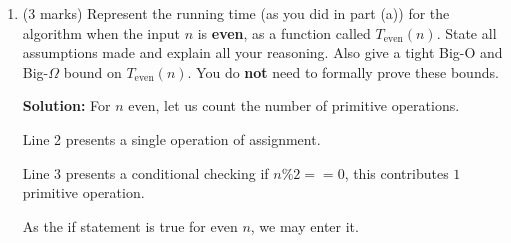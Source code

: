\documentclass[a4,13pt]{extarticle}
\DeclarePairedDelimiter\floor{\lfloor}{\rfloor}
\newenvironment{Solution}{\color{blue}\textbf{Solution:}}{}
\begin{document}
\begin{enumerate}
\begin{enumerate}
\begin{Solution}
By definition, an arbitrary function $f(n)$ is $\Omega(g(n))$ if there exist positive constants $c$ and $n_0$ such that $f(n)\ge cg(n)$ for all $n\geq n_0$.

To show that $T_{\text{odd}}(n)$ is $\Omega(\log n)$, let us suppose that $T_{\text{odd}}(n)\ge c\log_2(n)$, and attempt to find $c$ and $n_0$ values that uphold the proposed inequality.

First, observe that by the definition of the floor function, $10+6\floor{\log_2(n)}>9 + 6\log_2(n)$.

Therefore, $9 + 6\log_2(n)\ge c\log_2(n)\implies 10+6\floor{\log_2(n)}> c\log_2(n)$

If we let $c=6$, we observe the inequality holds for all positive $n$.

Thus, if we let $c=6$ and $n_0=1$, we obtain positive constants $c$ and $n_0$ such that $T_{\text{odd}}(n)\ge c\log_2(n)$, for all $n\ge n_0$.

Thus, $\Omega\left(\log n\right)$ is the tightest Big-$\Omega$ bound for $T_{\text{odd}}(n)$.

As shown in parts 1b and 1c, For all $n\ge 32, 6\log_2(n)\le T_{\text{odd}}(n)\le 8\log_2(n)$.

Thus, there exist positive constants $c_1=6$, $c_2=8$, $n_0=32$, such that for all $n\ge n_0$, $c_1\log_2(n)\le T_{\text{odd}}(n)\le c_2\log_2(n)$.

Hence, $T_{\text{odd}}(n)\in\Theta(\log n)$.
	      	\end{Solution}
	      	      	      	                  
	      	      	      	                  
	      	\item (3 marks) Represent the running time (as you did in part (a)) for the algorithm when the input $n$ is \textbf{even}, as a function called $T_{\text{even}}(n)$. State all assumptions made and explain all your reasoning. Also give a tight Big-O and Big-$\Omega$ bound on $T_{\text{even}}(n)$. You do \textbf{not} need to formally prove these bounds.
	      	
	      	\begin{Solution}
For $n$ even, let us count the number of primitive operations.

Line 2 presents a single operation of assignment.

Line 3 presents a conditional checking if $n \% 2 == 0$, this contributes $1$ primitive operation.

As the if statement is true for even $n$, we may enter it.


\end{Solution}
\end{enumerate}
\end{enumerate}
\end{document}
